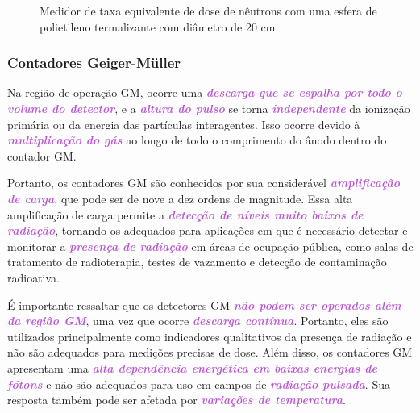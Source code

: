 \documentclass[11pt,a4paper]{article}
\begin{document}
	\begin{figure}[h]
		\centering
		\caption{Medidor de taxa equivalente de dose de nêutrons com uma esfera de polietileno termalizante com diâmetro de 20 cm.}
		\label{fig:monitorNeutron}
	\end{figure}

\subsubsection*{Contadores Geiger-Müller}

	Na região de operação GM, ocorre uma \textcolor{MediumOrchid}{\textit{\textbf{descarga que se espalha por todo o volume do detector}}}, e a \textcolor{MediumOrchid}{\textit{\textbf{altura do pulso}}} se torna \textcolor{MediumOrchid}{\textit{\textbf{independente}}} da ionização primária ou da energia das partículas interagentes. Isso ocorre devido à \textcolor{MediumOrchid}{\textit{\textbf{multiplicação do gás}}} ao longo de todo o comprimento do ânodo dentro do contador GM. 

	Portanto, os contadores GM são conhecidos por sua considerável \textcolor{MediumOrchid}{\textit{\textbf{amplificação de carga}}}, que pode ser de nove a dez ordens de magnitude. Essa alta amplificação de carga permite a \textcolor{MediumOrchid}{\textit{\textbf{detecção de níveis muito baixos de radiação}}}, tornando-os adequados para aplicações em que é necessário detectar e monitorar a \textcolor{MediumOrchid}{\textit{\textbf{presença de radiação}}} em áreas de ocupação pública, como salas de tratamento de radioterapia, testes de vazamento e detecção de contaminação radioativa.

	É importante ressaltar que os detectores GM \textcolor{MediumOrchid}{\textit{\textbf{não podem ser operados além da região GM}}}, uma vez que ocorre \textcolor{MediumOrchid}{\textit{\textbf{descarga contínua}}}. Portanto, eles são utilizados principalmente como indicadores qualitativos da presença de radiação e não são adequados para medições precisas de dose. Além disso, os contadores GM apresentam uma \textcolor{MediumOrchid}{\textit{\textbf{alta dependência energética em baixas energias de fótons}}} e não são adequados para uso em campos de \textcolor{MediumOrchid}{\textit{\textbf{radiação pulsada}}}. Sua resposta também pode ser afetada por \textcolor{MediumOrchid}{\textit{\textbf{variações de temperatura}}}.
\end{document}
